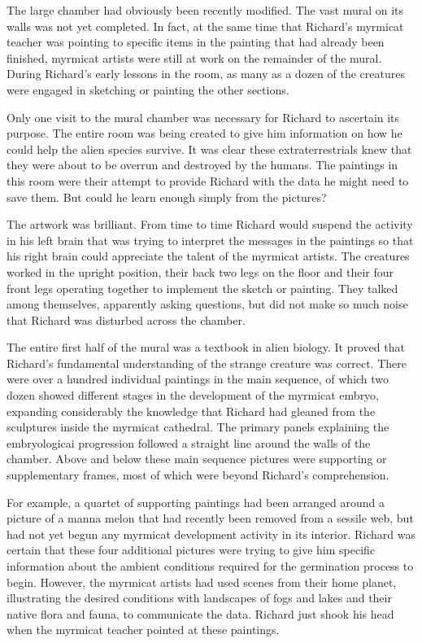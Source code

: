 \documentclass[]{article}
\begin{document}
{{The large chamber had obviously been recently modified.  The vast mural on its walls was not yet completed.  In fact, at the same time that Richard’s myrmicat teacher was pointing to specific items in the painting that had already been finished, myrmicat artists were still at work on the remainder of the mural.  During Richard’s early lessons in the room, as many as a dozen of the creatures were engaged in sketching or painting the other sections.

Only one visit to the mural chamber was necessary for Richard to ascertain its purpose.  The entire room was being created to give him information on how he could help the alien species survive.  It was clear these extraterrestrials knew that they were about to be overrun and destroyed by the humans.  The paintings in this room were their attempt to provide Richard with the data he might need to save them.  But could he learn enough simply from the pictures?

The artwork was brilliant.  From time to time Richard would suspend the activity in his left brain that was trying to interpret the messages in the paintings so that his right brain could appreciate the talent of the myrmicat artists.  The creatures worked in the upright position, their back two legs on the floor and their four front legs operating together to implement the sketch or painting.  They talked among themselves, apparently asking questions, but did not make so much noise that Richard was disturbed across the chamber.

The entire first half of the mural was a textbook in alien biology.  It proved that Richard’s fundamental understanding of the strange creature was correct.  There were over a hundred individual paintings in the main sequence, of which two dozen showed different stages in the development of the myrmicat embryo, expanding considerably the knowledge that Richard had gleaned from the sculptures inside the myrmicat cathedral.  The primary panels explaining the embryologicai progression followed a straight line around the walls of the chamber.  Above and below these main sequence pictures were supporting or supplementary frames, most of which were beyond Richard’s comprehension.

For example, a quartet of supporting paintings had been arranged around a picture of a manna melon that had recently been removed from a sessile web, but had not yet begun any myrmicat development activity in its interior.  Richard was certain that these four additional pictures were trying to give him specific information about the ambient conditions required for the germination process to begin.  However, the myrmicat artists had used scenes from their home planet, illustrating the desired conditions with landscapes of fogs and lakes and their native flora and fauna, to communicate the data.  Richard just shook his head when the myrmicat teacher pointed at these paintings.

}}
\end{document}
